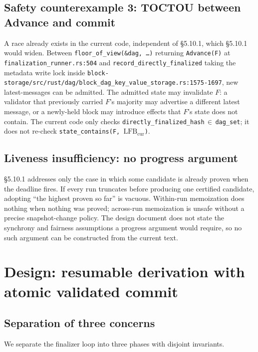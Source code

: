 \documentclass[11pt]{article}
\newcommand{\lfbcur}{\ensuremath{\mathrm{LFB}_{\mathrm{cur}}}}
\newcommand{\code}[1]{\texttt{#1}}
\begin{document}
\subsection{Safety counterexample 3: TOCTOU between Advance and commit}
\label{sec:cex-toctou}

A race already exists in the current code, independent of §5.10.1, which
§5.10.1 would widen. Between
\code{floor\_of\_view(\&dag, \ldots)} returning \code{Advance(F)} at
\code{finalization\_runner.rs:504} and
\code{record\_directly\_finalized} taking the metadata write lock inside
\code{block-storage/src/rust/dag/block\_dag\_key\_value\_storage.rs:1575-1697},
new latest-messages can be admitted. The admitted state may invalidate
$F$: a validator that previously carried $F$'s majority may advertise a
different latest message, or a newly-held block may introduce effects
that $F$'s state does not contain. The current code only checks
\code{directly\_finalized\_hash}\,$\in$\,\code{dag\_set}; it does not
re-check \code{state\_contains(F, \lfbcur)}.

\subsection{Liveness insufficiency: no progress argument}

§5.10.1 addresses only the case in which some candidate is already
proven when the deadline fires. If every run truncates before producing
one certified candidate, adopting ``the highest proven so far'' is
vacuous. Within-run memoization does nothing when nothing was proved;
across-run memoization is unsafe without a precise snapshot-change
policy. The design document does not state the synchrony and fairness
assumptions a progress argument would require, so no such argument can
be constructed from the current text.

\section{Design: resumable derivation with atomic validated commit}

\subsection{Separation of three concerns}

We separate the finalizer loop into three phases with disjoint
invariants.
\end{document}
